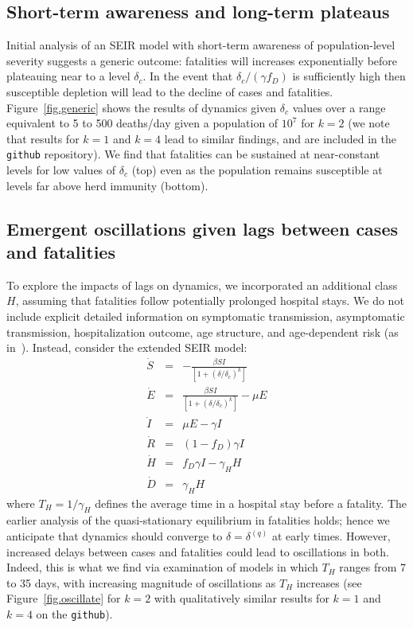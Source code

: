\subsection{Short-term awareness and long-term plateaus}
Initial analysis of an SEIR model with short-term 
awareness of population-level severity suggests a generic outcome: 
fatalities will increases
exponentially before plateauing near to a level $\delta_c$.
In the event that $\delta_c/(\gamma f_D)$ is sufficiently high then susceptible
depletion will lead to the decline of cases and fatalities.
Figure~\ref{fig.generic} shows
the results of dynamics given $\delta_c$ values over a range 
equivalent to 5 to 500 deaths/day given a population of $10^7$
for $k=2$ (we note that results for $k=1$ and $k=4$ lead to similar
findings, and are included in the \verb|github| repository).
We find that fatalities can be sustained at near-constant levels
for low values of $\delta_c$ (top)
even as the population remains susceptible at levels far above herd immunity (bottom).

\subsection{Emergent oscillations given lags between cases and fatalities}
To explore the impacts of lags on dynamics,
we incorporated an additional class $H$,
assuming that fatalities follow potentially prolonged
hospital stays.  We do not include explicit
detailed information on symptomatic transmission, asymptomatic
transmission, hospitalization outcome,
age structure, and age-dependent risk (as in~\citep{ferguson2020report}). 
Instead, consider the extended SEIR model:
\begin{eqnarray}
\dot{S} &=& -\frac{\beta SI}{\left[1+\left(\delta/\delta_c\right)^{k}\right]}\\
\dot{E} &=& \frac{\beta SI}{\left[1+\left(\delta/\delta_c\right)^{k}\right]}-\mu E\\
\dot{I} &=& \mu E-\gamma I \\
\dot{R} &=& (1-f_D)\gamma I\\
\dot{H} &=& f_D\gamma I - \gamma_H H\\
\dot{D} &=& \gamma_H H
\end{eqnarray}
where $T_H=1/\gamma_H$ defines the average time in a hospital
stay before a fatality. The earlier analysis of
the quasi-stationary equilibrium in fatalities holds; hence
we anticipate that dynamics should converge to $\delta=\delta^{(q)}$
at early times. However, increased delays between cases and
fatalities could lead to oscillations in both.  Indeed, this
is what we find via examination of models in which
$T_H$ ranges from 7 to 35 days, with increasing magnitude of
oscillations as $T_H$ increases (see Figure~\ref{fig.oscillate} 
for $k=2$ with qualitatively similar results for $k=1$ and
$k=4$ on the \verb|github|).

